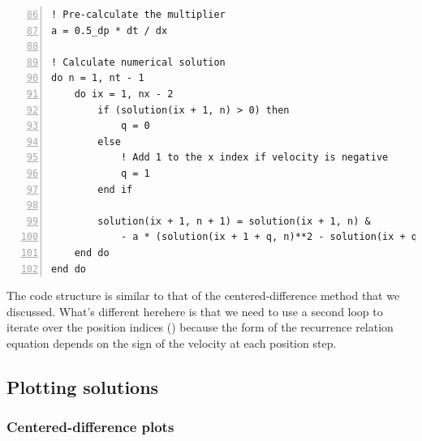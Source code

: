 \noindent\begin{minipage}{\linewidth}
\begin{lstlisting}[caption={Implementation of the upwind method of solving advection equation (\code{advection\_equation.f90}).},frame=tlrb,label={code_upwind}, numbers=left, firstnumber=86]
! Pre-calculate the multiplier
a = 0.5_dp * dt / dx

! Calculate numerical solution
do n = 1, nt - 1
    do ix = 1, nx - 2
        if (solution(ix + 1, n) > 0) then
            q = 0
        else
            ! Add 1 to the x index if velocity is negative
            q = 1
        end if

        solution(ix + 1, n + 1) = solution(ix + 1, n) &
            - a * (solution(ix + 1 + q, n)**2 - solution(ix + q, n)**2)
    end do
end do
\end{lstlisting}
\end{minipage}

The code structure is similar to that of the centered-difference method that we discussed. What's different herehere is that we need to use a second loop to iterate over the position indices () because the form of the recurrence relation equation depends on the sign of the velocity at each position step.


\subsection{Plotting solutions}

\subsubsection{Centered-difference plots}

